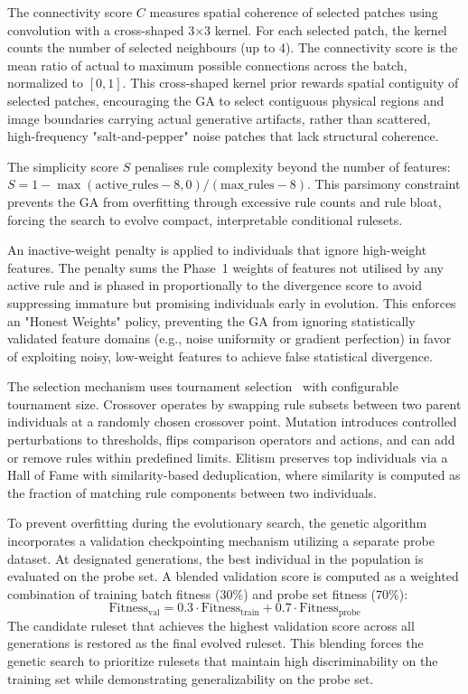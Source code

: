 \documentclass[runningheads]{llncs}
\begin{document}
The connectivity score $C$ measures spatial coherence of selected patches using convolution with a cross-shaped 3$\times$3 kernel. For each selected patch, the kernel counts the number of selected neighbours (up to 4). The connectivity score is the mean ratio of actual to maximum possible connections across the batch, normalized to $[0, 1]$. This cross-shaped kernel prior rewards spatial contiguity of selected patches, encouraging the GA to select contiguous physical regions and image boundaries carrying actual generative artifacts, rather than scattered, high-frequency "salt-and-pepper" noise patches that lack structural coherence.

The simplicity score $S$ penalises rule complexity beyond the number of features: $S = 1 - \max(\text{active\_rules} - 8, 0) / (\text{max\_rules} - 8)$. This parsimony constraint prevents the GA from overfitting through excessive rule counts and rule bloat, forcing the search to evolve compact, interpretable conditional rulesets.

An inactive-weight penalty is applied to individuals that ignore high-weight features. The penalty sums the Phase~1 weights of features not utilised by any active rule and is phased in proportionally to the divergence score to avoid suppressing immature but promising individuals early in evolution. This enforces an "Honest Weights" policy, preventing the GA from ignoring statistically validated feature domains (e.g., noise uniformity or gradient perfection) in favor of exploiting noisy, low-weight features to achieve false statistical divergence.

The selection mechanism uses tournament selection~\cite{goldberg1991comparative} with configurable tournament size. Crossover operates by swapping rule subsets between two parent individuals at a randomly chosen crossover point. Mutation introduces controlled perturbations to thresholds, flips comparison operators and actions, and can add or remove rules within predefined limits. Elitism preserves top individuals via a Hall of Fame with similarity-based deduplication, where similarity is computed as the fraction of matching rule components between two individuals.

To prevent overfitting during the evolutionary search, the genetic algorithm incorporates a validation checkpointing mechanism utilizing a separate probe dataset. At designated generations, the best individual in the population is evaluated on the probe set. A blended validation score is computed as a weighted combination of training batch fitness ($30\%$) and probe set fitness ($70\%$):
\begin{equation}
\text{Fitness}_{\text{val}} = 0.3 \cdot \text{Fitness}_{\text{train}} + 0.7 \cdot \text{Fitness}_{\text{probe}}
\label{eq:valblend}
\end{equation}
The candidate ruleset that achieves the highest validation score across all generations is restored as the final evolved ruleset. This blending forces the genetic search to prioritize rulesets that maintain high discriminability on the training set while demonstrating generalizability on the probe set.
\end{document}
